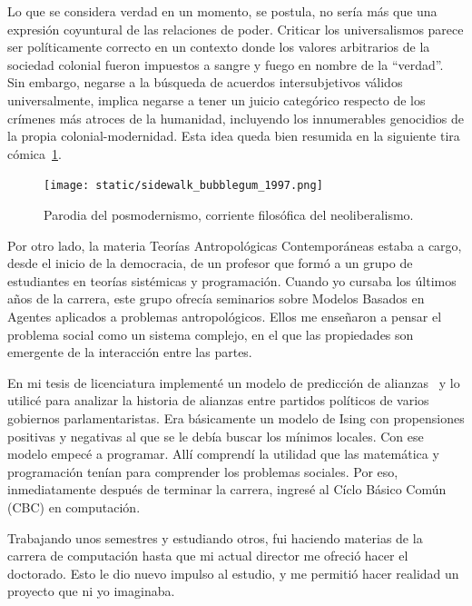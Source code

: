 \documentclass[a4paper,11pt]{book}
\theoremstyle{definition}
\begin{document}

Lo que se considera verdad en un momento, se postula, no ser\'ia m\'as que una expresi\'on coyuntural de las relaciones de poder.
%
Criticar los universalismos parece ser pol\'iticamente correcto en un contexto donde los valores arbitrarios de la sociedad colonial fueron impuestos a sangre y fuego en nombre de la ``verdad''.
%
Sin embargo, negarse a la b\'usqueda de acuerdos intersubjetivos v\'alidos universalmente, implica negarse a tener un juicio categ\'orico respecto de los cr\'imenes m\'as atroces de la humanidad, incluyendo los innumerables genocidios de la propia colonial-modernidad.
%
Esta idea queda bien resumida en la siguiente tira c\'omica~\ref{fig:sidewalk_bubblegum_1997}.


\begin{figure}[ht!]
\centering
\texttt{[image: static/sidewalk\_bubblegum\_1997.png]}
\caption{Parodia del posmodernismo, corriente filos\'ofica del neoliberalismo.}
\label{fig:sidewalk_bubblegum_1997}
\end{figure}


Por otro lado, la materia Teor\'ias Antropol\'ogicas Contempor\'aneas estaba a cargo, desde el inicio de la democracia, de un profesor que form\'o a un grupo de estudiantes en teor\'ias sist\'emicas y programaci\'on.
%
Cuando yo cursaba los \'ultimos a\~nos de la carrera, este grupo ofrec\'ia seminarios sobre Modelos Basados en Agentes aplicados a problemas antropol\'ogicos.
%
Ellos me ense\~naron a pensar el problema social como un sistema complejo, en el que las propiedades son emergente de la interacci\'on entre las partes.

%

En mi tesis de licenciatura implement\'e un modelo de predicci\'on de alianzas~\cite{axelrod1993} y lo utilic\'e para analizar la historia de alianzas entre partidos pol\'iticos de varios gobiernos parlamentaristas.
%
Era b\'asicamente un modelo de Ising con propensiones positivas y negativas al que se le deb\'ia buscar los m\'inimos locales.
%
Con ese modelo empec\'e a programar.
%
All\'i comprend\'i la utilidad que las matem\'atica y programaci\'on ten\'ian para comprender los problemas sociales.
%
Por eso, inmediatamente despu\'es de terminar la carrera, ingres\'e al C\'iclo B\'asico Com\'un (CBC) en computaci\'on.


Trabajando unos semestres y estudiando otros, fui haciendo materias de la carrera de computaci\'on hasta que mi actual director me ofreci\'o hacer el doctorado.
%
Esto le dio nuevo impulso al estudio, y me permiti\'o hacer realidad un proyecto que ni yo imaginaba.
\end{document}
